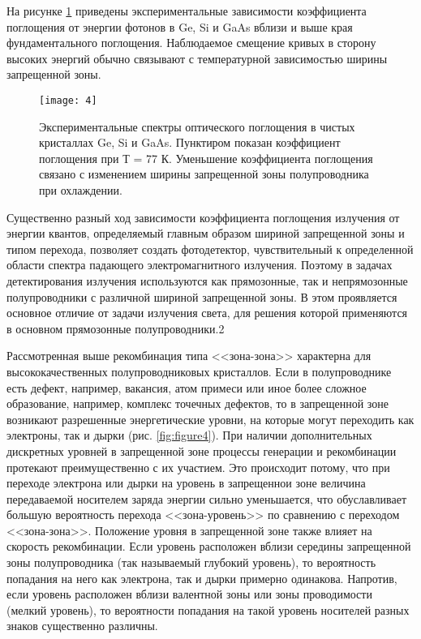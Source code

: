 \documentclass[a4paper,12pt]{article}
\begin{document}
На рисунке \ref{fig:figure3} приведены экспериментальные зависимости коэффициента поглощения от энергии фотонов в Ge, Si и GaAs вблизи и выше края фундаментального поглощения. Наблюдаемое смещение кривых в сторону высоких энергий обычно связывают с температурной зависимостью ширины запрещенной зоны.


\begin{figure}[H]
	\centering
	\texttt{[image: 4]}
	\caption{Экспериментальные спектры оптического поглощения в чистых кристаллах Ge, Si и GaAs. Пунктиром показан коэффициент поглощения при Т = 77 К. Уменьшение коэффициента поглощения связано с изменением ширины запрещенной зоны полупроводника при охлаждении.}
	\label{fig:figure3}
\end{figure}


Существенно разный ход зависимости коэффициента поглощения излучения от энергии квантов, определяемый главным образом шириной запрещенной зоны и типом перехода, позволяет создать фотодетектор, чувствительный к определенной области спектра падающего электромагнитного излучения. Поэтому в задачах детектирования излучения используются как прямозонные, так и непрямозонные полупроводники с различной шириной запрещенной зоны. В этом проявляется основное отличие от задачи излучения света, для решения которой применяются в основном прямозонные полупроводники.2

Рассмотренная выше рекомбинация типа <<зона-зона>> характерна для высококачественных полупроводниковых кристаллов. Если в полупроводнике есть дефект, например, вакансия, атом примеси или иное более сложное образование, например, комплекс точечных дефектов, то в запрещенной зоне возникают разрешенные энергетические уровни, на которые могут переходить как электроны, так и дырки (рис. \ref{fig:figure4}). При наличии дополнительных дискретных уровней в запрещенной зоне процессы генерации и рекомбинации протекают преимущественно с их участием. Это происходит потому, что при переходе электрона или дырки на уровень в запрещеннои зоне величина передаваемой носителем заряда энергии сильно уменьшается, что обуславливает большую вероятность перехода <<зона-уровень>> по сравнению с переходом <<зона-зона>>. Положение уровня в запрещенной зоне также влияет на скорость рекомбинации. Если уровень расположен вблизи середины запрещенной зоны полупроводника (так называемый глубокий уровень), то вероятность попадания на него как электрона, так и дырки примерно одинакова. Напротив, если уровень расположен вблизи валентной зоны или зоны проводимости (мелкий уровень), то вероятности попадания на такой уровень носителей разных знаков существенно различны.
\end{document}
